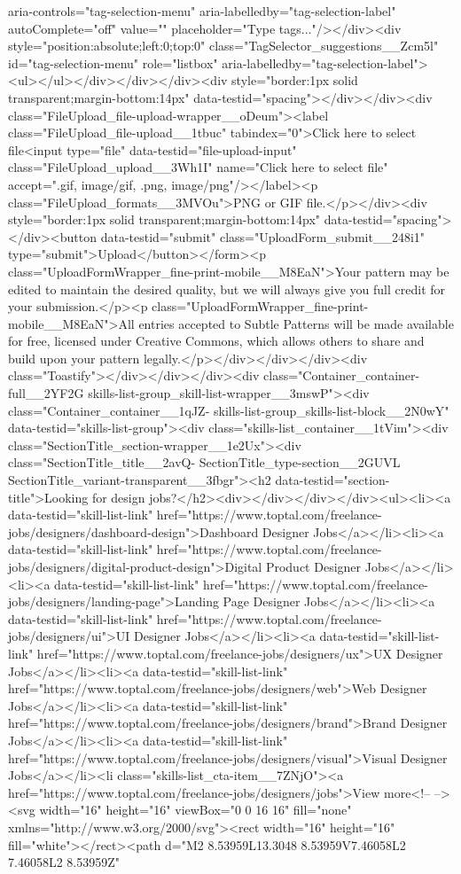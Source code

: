 aria-controls="tag-selection-menu" aria-labelledby="tag-selection-label" autoComplete="off" value="" placeholder="Type tags..."/></div><div style="position:absolute;left:0;top:0" class="TagSelector_suggestions__Zcm5l" id="tag-selection-menu" role="listbox" aria-labelledby="tag-selection-label"><ul></ul></div></div></div><div style="border:1px solid transparent;margin-bottom:14px" data-testid="spacing"></div></div><div class="FileUpload_file-upload-wrapper__oDeum"><label class="FileUpload_file-upload__1tbuc" tabindex="0">Click here to select file<input type="file" data-testid="file-upload-input" class="FileUpload_upload__3Wh1I" name="Click here to select file" accept=".gif, image/gif, .png, image/png"/></label><p class="FileUpload_formats__3MVOu">PNG or GIF file.</p></div><div style="border:1px solid transparent;margin-bottom:14px" data-testid="spacing"></div><button data-testid="submit" class="UploadForm_submit__248i1" type="submit">Upload</button></form><p class="UploadFormWrapper_fine-print-mobile__M8EaN">Your pattern may be edited to maintain the desired quality, but we will always give you full credit for your submission.</p><p class="UploadFormWrapper_fine-print-mobile__M8EaN">All entries accepted to Subtle Patterns will be made available for free, licensed under Creative Commons, which allows others to share and build upon your pattern legally.</p></div></div></div><div class="Toastify"></div></div></div><div class="Container_container-full__2YF2G skills-list-group_skill-list-wrapper__3mswP"><div class="Container_container__1qJZ- skills-list-group_skills-list-block__2N0wY" data-testid="skills-list-group"><div class="skills-list_container__1tVim"><div class="SectionTitle_section-wrapper__1e2Ux"><div class="SectionTitle_title__2avQ- SectionTitle_type-section__2GUVL SectionTitle_variant-transparent__3fbgr"><h2 data-testid="section-title">Looking for design jobs?</h2><div></div></div></div><ul><li><a data-testid="skill-list-link" href="https://www.toptal.com/freelance-jobs/designers/dashboard-design">Dashboard Designer Jobs</a></li><li><a data-testid="skill-list-link" href="https://www.toptal.com/freelance-jobs/designers/digital-product-design">Digital Product Designer Jobs</a></li><li><a data-testid="skill-list-link" href="https://www.toptal.com/freelance-jobs/designers/landing-page">Landing Page Designer Jobs</a></li><li><a data-testid="skill-list-link" href="https://www.toptal.com/freelance-jobs/designers/ui">UI Designer Jobs</a></li><li><a data-testid="skill-list-link" href="https://www.toptal.com/freelance-jobs/designers/ux">UX Designer Jobs</a></li><li><a data-testid="skill-list-link" href="https://www.toptal.com/freelance-jobs/designers/web">Web Designer Jobs</a></li><li><a data-testid="skill-list-link" href="https://www.toptal.com/freelance-jobs/designers/brand">Brand Designer Jobs</a></li><li><a data-testid="skill-list-link" href="https://www.toptal.com/freelance-jobs/designers/visual">Visual Designer Jobs</a></li><li class="skills-list_cta-item__7ZNjO"><a href="https://www.toptal.com/freelance-jobs/designers/jobs">View more<!-- --> <svg width="16" height="16" viewBox="0 0 16 16" fill="none" xmlns="http://www.w3.org/2000/svg"><rect width="16" height="16" fill="white"></rect><path d="M2 8.53959L13.3048 8.53959V7.46058L2 7.46058L2 8.53959Z" 